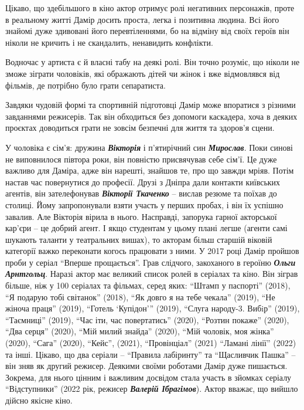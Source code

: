 
Цікаво, що здебільшого в кіно актор отримує ролі негативних персонажів, проте в
реальному житті Дамір досить проста, легка і позитивна людина. Всі його знайомі
дуже здивовані його перевтіленнями, бо на відміну від своїх героїв він ніколи
не кричить і не скандалить, ненавидить конфлікти.

Водночас у артиста є й власні табу на деякі ролі. Він точно розуміє, що ніколи
не зможе зіграти чоловіків, які ображають дітей чи жінок і вже відмовлявся від
фільмів, де потрібно було грати сепаратиста.

Завдяки чудовій формі та спортивній підготовці Дамір може впоратися з різними
завданнями режисерів. Так він обходиться без допомоги каскадера, хоча в деяких
проєктах доводиться грати не зовсім безпечні для життя та  здоров'я сцени.


У чоловіка є сім'я: дружина \emph{\textbf{Вікторія}} і п'ятирічний син \emph{\textbf{Мирослав}}. Поки синові не
виповнилося півтора роки, він повністю присвячував себе сім'ї. Це дуже  важливо
для Даміра, адже він нарешті, знайшов те, про що завжди мріяв. Потім настав час
повернутися до професії. Друзі з Дніпра дали контакти київських агентів, він
зателефонував \emph{\textbf{Вікторії Ткаченко}} – вислав резюме та поїхав до столиці. Йому
запропонували взяти участь у перших пробах, і він їх успішно завалив. Але
Вікторія вірила в нього. Насправді, запорука гарної акторської кар'єри – це
добрий агент. І якщо студентам у цьому плані легше (агенти самі шукають таланти
у театральних вишах), то акторам більш старшій віковій категорії важко
переконати когось працювати з ними. У 2017 році Дамір пройшов проби у серіал
\enquote{Вперше прощається}. Грав слідчого, закоханого в героїню \emph{\textbf{Ольги Арнтгольц}}.
Наразі актор має великий список ролей в серіалах та кіно. Він зіграв більше,
ніж у 100 серіалах та фільмах, серед яких: \enquote{Штамп у паспорті} (2018), \enquote{Я
подарую тобі світанок} (2018), \enquote{Як довго я на тебе чекала} (2019), \enquote{Не жіноча
праця} (2019), \enquote{Готель \enquote{Купідон}} (2019), \enquote{Слуга народу-3. Вибiр} (2019),
\enquote{Таємниці} (2019), \enquote{Час іти, час повертатись} (2020), \enquote{Розтин покаже} (2020),
\enquote{Два серця} (2020), \enquote{Мій милий знайда} (2020), \enquote{Мій чоловік, моя жінка} (2020),
\enquote{Сага} (2020), \enquote{Кейс}, (2021), \enquote{Провінціал} (2021) \enquote{Ламані лінії} (2022) та
інші. Цікаво, що два серіали – \enquote{Правила лабіринту} та \enquote{Щасливчик Пашка} – він
зняв як другий режисер. Деякими своїми роботами Дамір дуже пишається. Зокрема,
для нього цінним і важливим досвідом стала участь в зйомках серіалу
\enquote{Відступники} (2022 рік, режисер \emph{\textbf{Валерій Ібрагімов}}). Актор вважає, що вийшло
дійсно якісне кіно.

